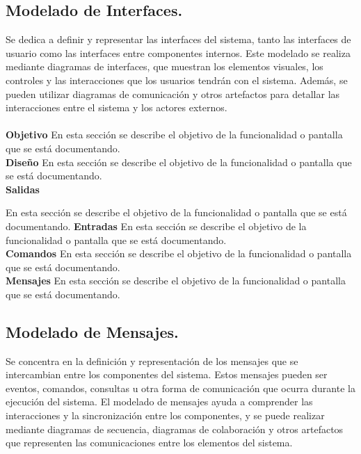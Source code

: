 \subsection{ Modelado de Interfaces.}
Se dedica a definir y representar las interfaces del sistema, tanto las interfaces de usuario como las interfaces entre componentes internos. Este modelado se realiza mediante diagramas de interfaces, que muestran los elementos visuales, los controles y las interacciones que los usuarios tendrán con el sistema. Además, se pueden utilizar diagramas de comunicación y otros artefactos para detallar las interacciones entre el sistema y los actores externos.\\
\\


\textbf{Objetivo}
	En esta sección se describe el objetivo de la funcionalidad o pantalla que se está documentando.\\

\textbf{Diseño}
	En esta sección se describe el objetivo de la funcionalidad o pantalla que se está documentando.\\
 
\textbf{Salidas}

	En esta sección se describe el objetivo de la funcionalidad o pantalla que se está documentando.
\textbf{Entradas}
En esta sección se describe el objetivo de la funcionalidad o pantalla que se está documentando.\\
\textbf{Comandos}
En esta sección se describe el objetivo de la funcionalidad o pantalla que se está documentando.
\\
\textbf{Mensajes}
En esta sección se describe el objetivo de la funcionalidad o pantalla que se está documentando.


\subsection{ Modelado de Mensajes.}

Se concentra en la definición y representación de los mensajes que se intercambian entre los componentes del sistema. Estos mensajes pueden ser eventos, comandos, consultas u otra forma de comunicación que ocurra durante la ejecución del sistema. El modelado de mensajes ayuda a comprender las interacciones y la sincronización entre los componentes, y se puede realizar mediante diagramas de secuencia, diagramas de colaboración y otros artefactos que representen las comunicaciones entre los elementos del sistema.

